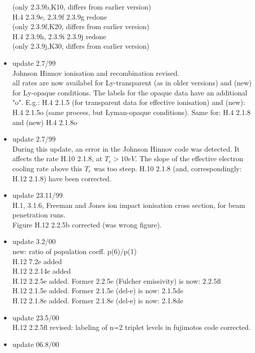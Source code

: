 \documentclass[12pt]{article}
\begin{document}
\begin{itemize}
               (only 2.3.9b,K10, differs from earlier version)\\
               H.4 2.3.9e, 2.3.9f 2.3.9g  redone \\
               (only 2.3.9f,K20, differs from earlier version)\\
               H.4 2.3.9h, 2.3.9i 2.3.9j  redone \\
               (only 2.3.9j,K30, differs from earlier version)\\
 \item update   2.7/99 \\
  Johnson Hinnov ionisation and recombination revised.\\
  all rates are now availabel for Ly-transparent (as in older versions)
  and (new) for Ly-opaque conditions. The labels for the opaque
  data have an additional "o". E.g.: H.4 2.1.5 (for transparent
  data for effective ionisation) and (new): H.4 2.1.5o (same process,
  but Lyman-opaque conditions). Same for: H.4 2.1.8 and (new) H.4 2.1.8o
 \item update   2.7/99 \\
  During this update, an error in the Johnson Hinnov code was detected.
  It affects the rate H.10 2.1.8, at $T_e > 10 eV$. The slope of the
  effective electron cooling rate above this $T_e$ was too steep.
  H.10 2.1.8  (and, correspondingly: H.12 2.1.8) have been corrected.
 \item update   23.11/99 \\
  H.1, 3.1.6, Freeman and Jones ion impact ionisation cross section,
  for beam penetration runs.\\
  Figure H.12 2.2.5b corrected (was wrong figure).
 \item update   3.2/00 \\
  new: ratio of population coeff. p(6)/p(1)\\
  H.12 7.2e added                            \\
  H.12 2.2.14e added                          \\
  H.12 2.2.5e added. Former 2.2.5e (Fulcher emissivity) is now:
2.2.5fl\\
  H.12 2.1.5e added. Former 2.1.5e (del-e) is now: 2.1.5de \\
  H.12 2.1.8e added. Former 2.1.8e (del-e) is now: 2.1.8de
 \item update  23.5/00 \\
  H.12 2.2.5fl revised: labeling of n=2 triplet levels in fujimotos
  code corrected.
 \item update  06.8/00 \\

\end{itemize}
\end{document}
